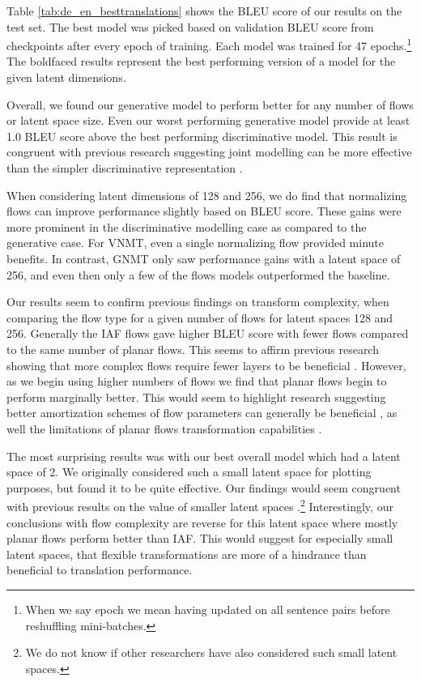 Table \ref{tab:de_en_besttranslations} shows the BLEU score of our results on the test set. The best model was picked based on validation BLEU score from checkpoints after every epoch of training. Each model was trained for 47 epochs.\footnote{When we say epoch we mean having updated on all sentence pairs before reshuffling mini-batches.} The boldfaced results represent the best performing version of a model for the given latent dimensions.

Overall, we found our generative model to perform better for any number of flows or latent space size. Even our worst performing generative model provide at least 1.0 BLEU score above the best performing discriminative model. This result is congruent with previous research suggesting joint modelling can be more effective than the simpler discriminative representation \cite{eikema2018AEVNMT}.

When considering latent dimensions of 128 and 256, we do find that normalizing flows can improve performance slightly based on BLEU score. These gains were more prominent in the discriminative modelling case as compared to the generative case. For \ac{VNMT}, even a single normalizing flow provided minute benefits. In contrast, \ac{GNMT} only saw performance gains with a latent space of 256, and even then only a few of the flows models outperformed the baseline. 

Our results seem to confirm previous findings on transform complexity, when comparing the flow type for a given number of flows for latent spaces 128 and 256. Generally the \ac{IAF} flows gave higher BLEU score with fewer flows compared to the same number of planar flows. This seems to affirm previous research showing that more complex flows require fewer layers to be beneficial \cite{kingma2016IAF,Berg2018SylvesterNF}. However, as we begin using higher numbers of flows we find that planar flows begin to perform marginally better. This would seem to highlight research suggesting better amortization schemes of flow parameters can generally be beneficial \cite{Berg2018SylvesterNF}, as well the limitations of planar flows transformation capabilities \cite{rezende2015VIwithNF,Berg2018SylvesterNF}.

The most surprising results was with our best overall model which had a latent space of 2. We originally considered such a small latent space for plotting purposes, but found it to be quite effective. Our findings would seem congruent with previous results on the value of smaller latent spaces \cite{schulz2018StochasticDecoder}.\footnote{We do not know if other researchers have also considered such small latent spaces. } Interestingly, our conclusions with flow complexity are reverse for this latent space where mostly planar flows perform better than \ac{IAF}. This would suggest for especially small latent spaces, that flexible transformations are more of a hindrance than beneficial to translation performance. 



